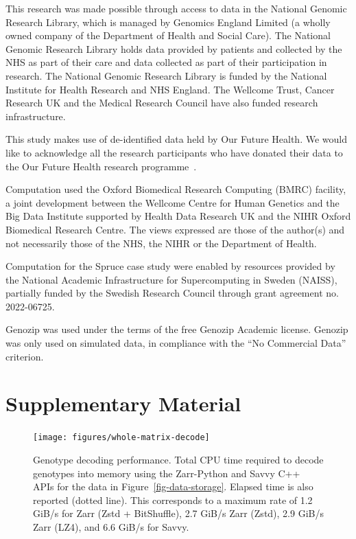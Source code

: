 \documentclass[a4paper,num-refs]{oup-contemporary}
\begin{document}
This research was made possible through access to data in the National Genomic
Research Library, which is managed by Genomics England Limited (a wholly owned
company of the Department of Health and Social Care). The National Genomic
Research Library holds data provided by patients and collected by the NHS as
part of their care and data collected as part of their participation in
research. The National Genomic Research Library is funded by the National
Institute for Health Research and NHS England. The Wellcome Trust, Cancer
Research UK and the Medical Research Council have also funded research
infrastructure.

This study makes use of de-identified data held by Our Future Health.
We would like to acknowledge all the research participants who have donated
their data to the Our Future Health research programme~\cite{ofhpubpolicy}.

Computation used the Oxford Biomedical Research Computing (BMRC) facility, a
joint development between the Wellcome Centre for Human Genetics and the Big
Data Institute supported by Health Data Research UK and the NIHR Oxford
Biomedical Research Centre. The views expressed are those of the author(s) and
not necessarily those of the NHS, the NIHR or the Department of Health.

Computation for the Spruce case study were enabled by resources
provided by the National Academic Infrastructure for Supercomputing in
Sweden (NAISS), partially funded by the Swedish Research Council
through grant agreement no. 2022-06725.

Genozip was used under the terms of the free Genozip Academic license.
Genozip was only used on simulated data, in compliance with
the ``No Commercial Data'' criterion.



\renewcommand\thefigure{S\arabic{figure}}
\setcounter{figure}{0}
\renewcommand\thetable{S\arabic{table}}
\setcounter{table}{0}

\section*{Supplementary Material}

\begin{figure}[h]
\texttt{[image: figures/whole-matrix-decode]}
\caption{Genotype decoding performance.
Total CPU time required to decode genotypes into memory using the Zarr-Python
and Savvy C++ APIs for the data in Figure~\ref{fig-data-storage}.
Elapsed time is also reported (dotted line).
This corresponds to a maximum rate of 1.2 GiB/s for Zarr (Zstd + BitShuffle),
2.7 GiB/s Zarr (Zstd), 2.9 GiB/s Zarr (LZ4), and 6.6 GiB/s for Savvy.
\label{fig-whole-matrix-decode}}
\end{figure}
\end{document}
